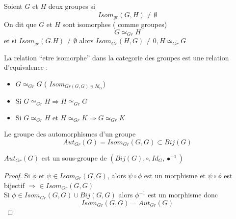 \documentclass[../main.tex]{subfiles}
\begin{document}
\begin{defn}\label{defn:groupes_isomorphes}
	Soient $G$ et $H$ deux groupes si
	\[ 
		Isom_{gr} ( G,H) \neq \emptyset
	\]
	On dit que $G$ et $H$ sont isomorphes ( comme groupes)
	\[ 
	G \simeq _{Gr} H
	\]
	et si $Isom_{gr} ( G.H) \neq \emptyset$ alors
	$Isom_{Gr} ( H,G) \neq 0, H \simeq_{Gr} G$
\end{defn}
La relation ``etre isomorphe'' dans la categorie des groupes est une relation d'equivalence :
\begin{itemize}
	\item $G\simeq_{Gr} G$ ( $Isom_{Gr(G,G) \ni Id_G} $)
	\item Si $G\simeq _{Gr} H \Rightarrow  H \simeq_{Gr} G$
	\item Si $G \simeq_{Gr} H$ et $H\simeq_{Gr} K \Rightarrow  G \simeq_{Gr} K$
\end{itemize}
\begin{exemple}
Le groupe des automorphismes d'un groupe
\[ 
	Aut_{Gr} ( G) = Isom_{Gr} ( G,G) \subset Bij(G)
\]

\end{exemple}
\begin{thm}
	$Aut _{Gr} ( G)$ est un sous-groupe de $\left(Bij(G), \circ, Id_G, \bullet^{-1}\right)$
\end{thm}
\begin{proof}
	Si $\phi$ et $\psi \in Isom_{Gr} ( G,G)$, alors $\psi\circ\phi$ est un morphisme et $\psi\circ\phi$ est bijectif
	$\Rightarrow \in Isom_{Gr} ( G,G)$ \\
	Si $\phi \in Isom_{Gr} ( G,G) \cup Bij(G,G)$ alors $\phi^{-1}$ est un morphisme donc
	\[ 
		Isom_{Gr} ( G,G) = Aut_{Gr} ( G)
	\]
\end{proof}





	





		

		
	
\end{document}
